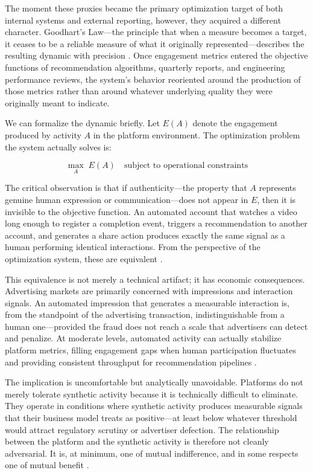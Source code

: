 \documentclass[12pt,a4paper]{article}
\begin{document}
The moment these proxies became the primary optimization target of both internal systems and
external reporting, however, they acquired a different character. Goodhart's Law---the principle
that when a measure becomes a target, it ceases to be a reliable measure of what it originally
represented---describes the resulting dynamic with precision \citep{strathern1997}. Once
engagement metrics entered the objective functions of recommendation algorithms, quarterly
reports, and engineering performance reviews, the system's behavior reoriented around the
production of those metrics rather than around whatever underlying quality they were originally
meant to indicate.

We can formalize the dynamic briefly. Let $E(A)$ denote the engagement produced by activity
$A$ in the platform environment. The optimization problem the system actually solves is:

\begin{equation}
\max_{A} \; E(A) \quad \text{subject to operational constraints}
\label{eq:engmax}
\end{equation}

The critical observation is that if authenticity---the property that $A$ represents genuine
human expression or communication---does not appear in $E$, then it is invisible to the
objective function. An automated account that watches a video long enough to register a
completion event, triggers a recommendation to another account, and generates a share action
produces exactly the same signal as a human performing identical interactions. From the
perspective of the optimization system, these are equivalent \citep{tufekci2015}.

This equivalence is not merely a technical artifact; it has economic consequences. Advertising
markets are primarily concerned with impressions and interaction signals. An automated impression
that generates a measurable interaction is, from the standpoint of the advertising transaction,
indistinguishable from a human one---provided the fraud does not reach a scale that advertisers
can detect and penalize. At moderate levels, automated activity can actually stabilize platform
metrics, filling engagement gaps when human participation fluctuates and providing consistent
throughput for recommendation pipelines \citep{bakshy2015}.

The implication is uncomfortable but analytically unavoidable. Platforms do not merely tolerate
synthetic activity because it is technically difficult to eliminate. They operate in conditions
where synthetic activity produces measurable signals that their business model treats as
positive---at least below whatever threshold would attract regulatory scrutiny or advertiser
defection. The relationship between the platform and the synthetic activity is therefore not
cleanly adversarial. It is, at minimum, one of mutual indifference, and in some respects one
of mutual benefit \citep{zuboff2019}.
\end{document}
